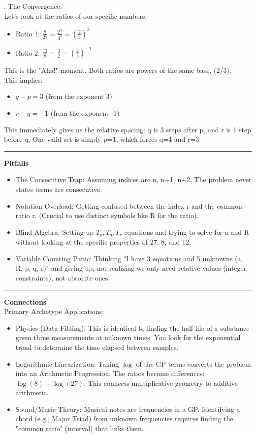 \documentclass{article}
\begin{document}
. The Convergence: \\
\noindent Let's look at the ratios of our specific numbers:
\begin{itemize}
    \item Ratio 1: $\frac{8}{27} = \frac{2^3}{3^3} = \left(\frac{2}{3}\right)^3$
    \item Ratio 2: $\frac{12}{8} = \frac{3}{2} = \left(\frac{2}{3}\right)^{-1}$
\end{itemize}
\noindent This is the "Aha!" moment. Both ratios are powers of the same base, (2/3). \\
\noindent This implies:
\begin{itemize}
    \item $q - p = 3$ (from the exponent 3)
    \item $r - q = -1$ (from the exponent -1)
\end{itemize}
\noindent This immediately gives us the relative spacing: q is 3 steps after p, and r is 1 step before q. One valid set is simply p=1, which forces q=4 and r=3. \\

\noindent \rule{\textwidth}{0.4pt}

\noindent \textbf{Pitfalls}
\begin{itemize}
    \item The Consecutive Trap: Assuming indices are n, n+1, n+2. The problem never states terms are consecutive.
    \item Notation Overload: Getting confused between the index r and the common ratio r. (Crucial to use distinct symbols like R for the ratio).
    \item Blind Algebra: Setting up $T_p, T_q, T_r$ equations and trying to solve for a and R without looking at the specific properties of 27, 8, and 12.
    \item Variable Counting Panic: Thinking "I have 3 equations and 5 unknowns (a, R, p, q, r)" and giving up, not realizing we only need relative values (integer constraints), not absolute ones.
\end{itemize}

\noindent \rule{\textwidth}{0.4pt}

\noindent \textbf{Connections} \\

\noindent Primary Archetype Applications:
\begin{itemize}
    \item Physics (Data Fitting): This is identical to finding the half-life of a substance given three measurements at unknown times. You look for the exponential trend to determine the time elapsed between samples.
    \item Logarithmic Linearization: Taking $\log$ of the GP terms converts the problem into an Arithmetic Progression. The ratios become differences: $\log(8) - \log(27)$. This connects multiplicative geometry to additive arithmetic.
    \item Sound/Music Theory: Musical notes are frequencies in a GP. Identifying a chord (e.g., Major Triad) from unknown frequencies requires finding the "common ratio" (interval) that links them.
\end{itemize}
\end{document}
